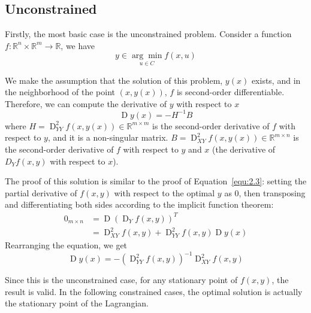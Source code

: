 \subsection{Unconstrained}
Firstly, the most basic case is the unconstrained problem. Consider a function $f: \mathbb{R}^n \times \mathbb{R}^m \rightarrow \mathbb{R}$, we have
\begin{equation}
    y \in \underset{u \in C}{\arg \min } f(x, u)
\end{equation}
\par We make the assumption that the solution of this problem, $y(x)$ exists, and in the neighborhood of the point $(x, y(x))$, $f$ is second-order differentiable. Therefore, we can compute the derivative of $y$ with respect to $x$
$$
\operatorname{D}y(x) = -H^{-1}B
$$
where $H = \operatorname{D}_{YY}^2 f(x, y(x)) \in \mathbb{R}^{m \times m}$ is the second-order derivative of $f$ with respect to $y$, and it is a non-singular matrix. $B = \operatorname{D}_{XY}^2 f(x, y(x)) \in \mathbb{R}^{m \times n}$ is the second-order derivative of $f$ with respect to $y$ and $x$ (the derivative of $D_Yf(x,y)$ with respect to $x$). 
\par The proof of this solution is similar to the proof of Equation~\ref{equ:2.3}: setting the partial derivative of $f(x,y)$ with respect to the optimal $y$ as 0, then transposing and differentiating both sides according to the implicit function theorem: 
\begin{equation}
    \begin{aligned} 
        0_{m \times n} &=\operatorname{D}\left(\operatorname{D}_{Y} f(x, y)\right)^{T} \\ &=\operatorname{D}_{X Y}^{2} f(x, y)+\operatorname{D}_{Y Y}^{2} f(x, y) \operatorname{D} y(x) 
    \end{aligned}
\end{equation}
Rearranging the equation, we get
\begin{equation}
    \operatorname{D} y(x)=-\left(\operatorname{D}_{Y Y}^{2} f(x, y)\right)^{-1} \operatorname{D}_{X Y}^{2} f(x, y)
\end{equation}
\par Since this is the unconstrained case, for any stationary point of $f(x,y)$, the result is valid. In the following constrained cases, the optimal solution is actually the stationary point of the Lagrangian. 

